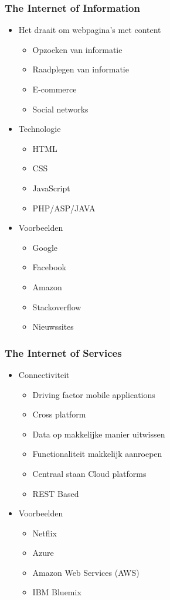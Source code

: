 \documentclass{article}
\begin{document}
\subsubsection{The Internet of Information}
\begin{itemize}
    \item Het draait om webpagina’s met content
    \begin{itemize}
        \item Opzoeken van informatie
        \item Raadplegen van informatie
        \item E-commerce
        \item Social networks
    \end{itemize}
    \item Technologie
    \begin{itemize}
        \item HTML
        \item CSS
        \item JavaScript
        \item PHP/ASP/JAVA
    \end{itemize}
    \item Voorbeelden
    \begin{itemize}
        \item Google
        \item Facebook
        \item Amazon
        \item Stackoverflow
        \item Nieuwssites
    \end{itemize}
\end{itemize}


\subsubsection{The Internet of Services}
\begin{itemize}
    \item Connectiviteit
    \begin{itemize}
        \item Driving factor mobile applications
        \item Cross platform
        \item Data op makkelijke manier uitwissen
        \item Functionaliteit makkelijk aanroepen
        \item Centraal staan Cloud platforms
        \item REST Based
    \end{itemize}
    \item Voorbeelden
    \begin{itemize}
        \item Netflix
        \item Azure
        \item Amazon Web Services (AWS)
        \item IBM Bluemix
    \end{itemize}
\end{itemize}
\end{document}
